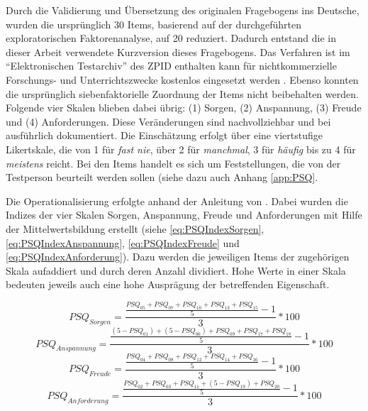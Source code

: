 Durch die Validierung und Übersetzung des originalen Fragebogens ins Deutsche, wurden die ursprünglich 30 Items, basierend auf der durchgeführten exploratorischen Faktorenanalyse, auf 20 reduziert. Dadurch entstand die in dieser Arbeit verwendete Kurzversion dieses Fragebogens. Das Verfahren ist im \enquote{Elektronischen Testarchiv} des ZPID enthalten kann für nichtkommerzielle Forschungs- und Unterrichtszwecke kostenlos eingesetzt werden \cite{ZPID}. Ebenso konnten die ursprünglich siebenfaktorielle Zuordnung der Items nicht beibehalten werden. Folgende vier Skalen blieben dabei übrig: (1) Sorgen, (2) Anspannung, (3) Freude und (4) Anforderungen. Diese Veränderungen sind nachvollziehbar und bei  ausführlich dokumentiert. Die Einschätzung erfolgt über eine viertstufige Likertskale, die von 1 für \textit{fast nie}, über 2 für \textit{manchmal}, 3 für \textit{häufig} bis zu 4 für \textit{meistens} reicht. Bei den Items handelt es sich um Feststellungen, die von der Testperson beurteilt werden sollen (siehe dazu auch Anhang \ref{app:PSQ}. 

Die Operationalisierung erfolgte anhand der Anleitung von . Dabei wurden die Indizes der vier Skalen Sorgen, Anspannung, Freude und Anforderungen mit Hilfe der Mittelwertsbildung erstellt (siehe \ref{eq:PSQIndexSorgen}, \ref{eq:PSQIndexAnspannung}, \ref{eq:PSQIndexFreude} und \ref{eq:PSQIndexAnforderung}). Dazu werden die jeweiligen Items der zugehörigen Skala aufaddiert und durch deren Anzahl dividiert. Hohe Werte in einer Skala bedeuten jeweils auch eine hohe Ausprägung der betreffenden Eigenschaft.

\begin{equation}\label{eq:PSQIndexSorgen}
    PSQ_{Sorgen}=\frac{\frac{PSQ_{05}+PSQ_{07}+PSQ_{10}+PSQ_{13}+PSQ_{15}}{5}-1}{3}*100
\end{equation}
\begin{equation}\label{eq:PSQIndexAnspannung}
    PSQ_{Anspannung}=\frac{\frac{(5-PSQ_{01})+(5-PSQ_{06})+PSQ_{09}+PSQ_{17}+PSQ_{18}}{5}-1}{3}*100
\end{equation}
\begin{equation}\label{eq:PSQIndexFreude}
    PSQ_{Freude}=\frac{\frac{PSQ_{04}+PSQ_{08}+PSQ_{12}+PSQ_{14}+PSQ_{16}}{5}-1}{3}*100
\end{equation}
\begin{equation}\label{eq:PSQIndexAnforderung}
    PSQ_{Anforderung}=\frac{\frac{PSQ_{02}+PSQ_{03}+PSQ_{11}+(5-PSQ_{19})+PSQ_{20}}{5}-1}{3}*100
\end{equation}

